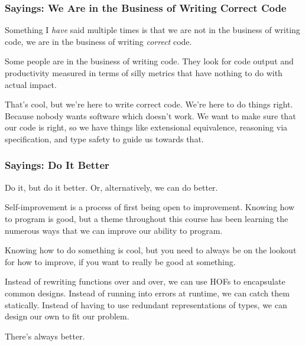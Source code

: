 \documentclass[aspectratio=169, handout]{beamer}
\begin{document}
\begin{frame}[fragile]
  \frametitle{Sayings: We Are in the Business of Writing Correct Code}

  Something I \textit{have} said multiple times is that we are not in
  the business of writing code, we are in the business of writing
  \textit{correct} code.

  \pause
  \vspace{\fill}

  Some people are in the business of writing code. They look for code
  output and productivity measured in terms of silly metrics that have
  nothing to do with actual impact.

  \pause
  \vspace{\fill}

  That's cool, but we're here to write correct code. We're here to do
  things right. Because nobody wants software which doesn't work. We
  want to make sure that our code is right, so we have things like
  extensional equivalence, reasoning via specification, and type safety
  to guide us towards that.
\end{frame}

\begin{frame}[fragile]
  \frametitle{Sayings: Do It Better}

  Do it, but do it better. Or, alternatively, we can do better.

  \pause
  \vspace{\fill}

  Self-improvement is a process of first being open to improvement.
  Knowing how to program is good, but a theme throughout this course has
  been learning the numerous ways that we can improve our ability to
  program.

  \pause
  \vspace{\fill}

  Knowing how to do something is cool, but you need to always be on the
  lookout for how to improve, if you want to really be good at something.

  \pause
  \vspace{\fill}

  Instead of rewriting functions over and over, we can use HOFs to encapsulate
  common designs. Instead of running into errors at runtime, we can catch
  them statically. Instead of having to use redundant representations of types,
  we can design our own to fit our problem.

  \pause
  \vspace{\fill}

  There's always better.
\end{frame}
\end{document}

